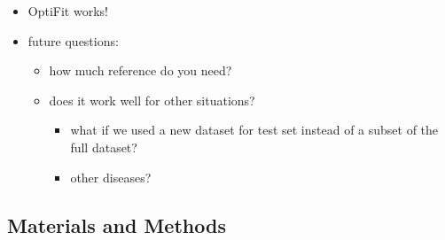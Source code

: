 \documentclass[
  11pt,
]{article}
\providecommand{\tightlist}{%
  \setlength{\itemsep}{0pt}\setlength{\parskip}{0pt}}
\begin{document}
\begin{itemize}
\tightlist
\item
  OptiFit works!
\item
  future questions:

  \begin{itemize}
  \tightlist
  \item
    how much reference do you need?
  \item
    does it work well for other situations?

    \begin{itemize}
    \tightlist
    \item
      what if we used a new dataset for test set instead of a subset of
      the full dataset?
    \item
      other diseases?
    \end{itemize}
  \end{itemize}
\end{itemize}

\hypertarget{materials-and-methods}{%
\subsection{Materials and Methods}\label{materials-and-methods}}
\end{document}

